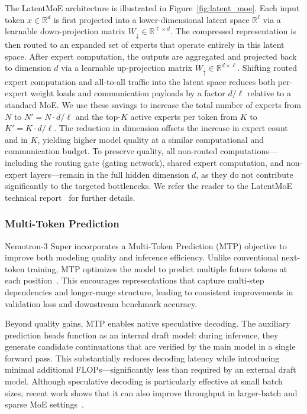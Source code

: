 The LatentMoE architecture is illustrated in Figure~\ref{fig:latent_moe}.
Each input token $x \in \mathbb{R}^d$ is first projected into a lower-dimensional latent space $\mathbb{R}^{\ell}$ via a learnable down-projection matrix $W_{\downarrow} \in \mathbb{R}^{\ell \times d}$.
The compressed representation is then routed to an expanded set of experts that operate entirely in this latent space.
After expert computation, the outputs are aggregated and projected back to dimension $d$ via a learnable up-projection matrix $W_{\uparrow} \in \mathbb{R}^{d \times \ell}$.
Shifting routed expert computation and all-to-all traffic into the latent space reduces both per-expert weight loads and communication payloads by a factor $d/\ell$ relative to a standard MoE.
We use these savings to increase the total number of experts from $N$ to $N' = N \cdot d/\ell$ and the top-$K$ active experts per token from $K$ to $K' = K \cdot d/\ell$.
The reduction in dimension offsets the increase in expert count and in $K$, yielding higher model quality at a similar computational and communication budget.
To preserve quality, all non-routed computations---including the routing gate (gating network), shared expert computation, and non-expert layers---remain in the full hidden dimension $d$, as they do not contribute significantly to the targeted bottlenecks.
We refer the reader to the LatentMoE technical report~\citep{latentmoe_tr} for further details.





\subsubsection{Multi-Token Prediction} \label{sec:mtp}
Nemotron-3 Super incorporates a Multi-Token Prediction (MTP) objective to improve both modeling quality and inference efficiency. Unlike conventional next-token training, MTP optimizes the model to predict multiple future tokens at each position~\citep{gloeckle2024better, deepseekai2025deepseekv3technicalreport}. This encourages representations that capture multi-step dependencies and longer-range structure, leading to consistent improvements in validation loss and downstream benchmark accuracy.

Beyond quality gains, MTP enables native speculative decoding. The auxiliary prediction heads function as an internal draft model: during inference, they generate candidate continuations that are verified by the main model in a single forward pass. This substantially reduces decoding latency while introducing minimal additional FLOPs—significantly less than required by an external draft model. Although speculative decoding is particularly effective at small batch sizes, recent work shows that it can also improve throughput in larger-batch and sparse MoE settings~\citep{huang2025moesd}.

